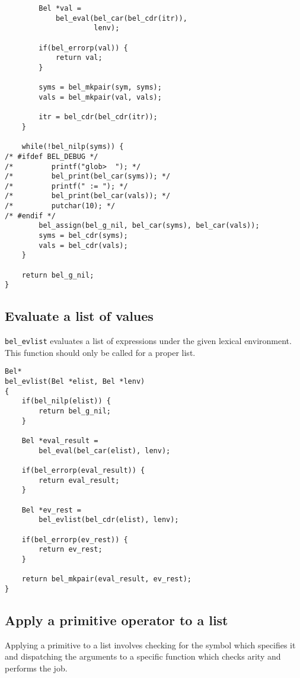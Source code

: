 \documentclass[openright,a4paper,twoside,12pt]{memoir}
\begin{document}
\begin{enumerate}
\begin{verbatim}
        Bel *val =
            bel_eval(bel_car(bel_cdr(itr)),
                     lenv);

        if(bel_errorp(val)) {
            return val;
        }
        
        syms = bel_mkpair(sym, syms);
        vals = bel_mkpair(val, vals);
        
        itr = bel_cdr(bel_cdr(itr));
    }

    while(!bel_nilp(syms)) {
/* #ifdef BEL_DEBUG */
/*         printf("glob>  "); */
/*         bel_print(bel_car(syms)); */
/*         printf(" := "); */
/*         bel_print(bel_car(vals)); */
/*         putchar(10); */
/* #endif */
        bel_assign(bel_g_nil, bel_car(syms), bel_car(vals));
        syms = bel_cdr(syms);
        vals = bel_cdr(vals);
    }

    return bel_g_nil;
}
\end{verbatim}
\end{enumerate}

\subsection{Evaluate a list of values}
\label{sec:org9316852}

\texttt{bel\_evlist} evaluates a list of expressions under the given lexical
environment. This function should only be called for a proper list.

\begin{verbatim}
Bel*
bel_evlist(Bel *elist, Bel *lenv)
{
    if(bel_nilp(elist)) {
        return bel_g_nil;
    }

    Bel *eval_result =
        bel_eval(bel_car(elist), lenv);

    if(bel_errorp(eval_result)) {
        return eval_result;
    }

    Bel *ev_rest =
        bel_evlist(bel_cdr(elist), lenv);

    if(bel_errorp(ev_rest)) {
        return ev_rest;
    }

    return bel_mkpair(eval_result, ev_rest);
}
\end{verbatim}

\subsection{Apply a primitive operator to a list}
\label{sec:orgb031528}

Applying a primitive to a list involves checking for the symbol which
specifies it and dispatching the arguments to a specific function
which checks arity and performs the job.
\end{document}
